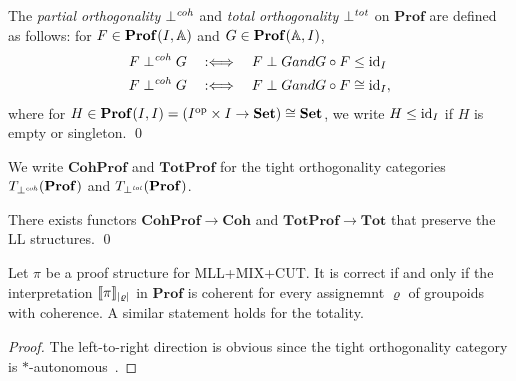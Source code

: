 \newcommand{\ProfCat}{\mathbf{Prof}}
\newcommand{\CohProf}{\mathbf{CohProf}}
\newcommand{\TotProf}{\mathbf{TotProf}}
\begin{definition}
    The \emph{partial orthogonality} \( \mathrel{\bot}^{\mathit{coh}} \) and \emph{total orthogonality} \( \mathrel{\bot}^{\mathit{tot}} \) on \( \ProfCat \) are defined as follows:
    for \( F \in \ProfCat(I, \Grp) \) and \( G \in \ProfCat(\Grp, I) \),
    \begin{align*}
        F \mathrel{\bot}^{\mathit{coh}} G &\quad:\Longleftrightarrow\quad F \mathrel{\bot} G \relax{ and } G \circ F \le \mathrm{id}_I \\ 
        F \mathrel{\bot}^{\mathit{coh}} G &\quad:\Longleftrightarrow\quad F \mathrel{\bot} G \relax{ and } G \circ F \cong \mathrm{id}_I,
    \end{align*}
    where for \( H \in \ProfCat(I,I) = (I^\op \times I \to \Set) \cong \Set \), we write \( H \le \mathrm{id}_I \) if \( H \) is empty or singleton.
    \qed
\end{definition}

We write \( \CohProf \) and \( \TotProf \) for the tight orthogonality categories \( T_{\orthogonal^{\mathit{coh}}}(\ProfCat) \) and \( T_{\orthogonal^{\mathit{tot}}}(\ProfCat) \).

\newcommand{\Coh}{\mathbf{Coh}}
\newcommand{\Tot}{\mathbf{Tot}}
\begin{proposition}
    There exists functors \( \CohProf \longrightarrow \Coh \) and \( \TotProf \longrightarrow \Tot \) that preserve the LL structures.
    \qed
\end{proposition}

\begin{theorem}
    Let \( \pi \) be a proof structure for \textsf{MLL+MIX+CUT}.
    It is correct if and only if the interpretation \( \llbracket{\pi}\rrbracket_{|\varrho|} \) in \( \ProfCat \) is coherent for every assignemnt \( \varrho \) of groupoids with coherence.
    A similar statement holds for the totality.
\end{theorem}
\begin{proof}
    The left-to-right direction is obvious since the tight orthogonality category is \( * \)-autonomous~\cite{Hyland2003}.
\end{proof}
